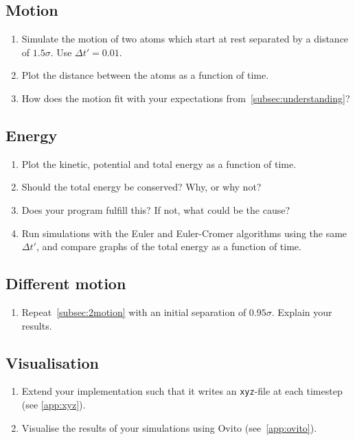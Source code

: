 \documentclass[11pt,british,a4paper]{report}
\begin{document}
\subsection{Motion}\label{subsec:2motion}
\begin{enumerate}[label=\roman*.]
    \item Simulate the motion of two atoms which start at rest separated by a distance of \(\num{1.5}\sigma\). Use \(\Delta t'=\num{0.01}\).
    \item Plot the distance between the atoms as a function of time.
    \item How does the motion fit with your expectations from~\vref{subsec:understanding}?
\end{enumerate}

\subsection{Energy}
\begin{enumerate}[label=\roman*.]
    \item Plot the kinetic, potential and total energy as a function of time.
    \item Should the total energy be conserved? Why, or why not?
    \item Does your program fulfill this? If not, what could be the cause?
    \item Run simulations with the Euler and Euler-Cromer algorithms using the same \(\Delta t'\), and compare graphs of the total energy as a function of time.
\end{enumerate}

\subsection{Different motion}
\begin{enumerate}[label=\roman*.]
    \item Repeat~\vref{subsec:2motion} with an initial separation of \(\num{0.95}\sigma\). Explain your results.
\end{enumerate}

\subsection{Visualisation}
\begin{enumerate}[label=\roman*.]
    \item Extend your implementation such that it writes an \texttt{xyz}-file at each timestep (see \vref{app:xyz}).
    \item Visualise the results of your simulations using Ovito (see~\vref{app:ovito}).
\end{enumerate}
\end{document}

